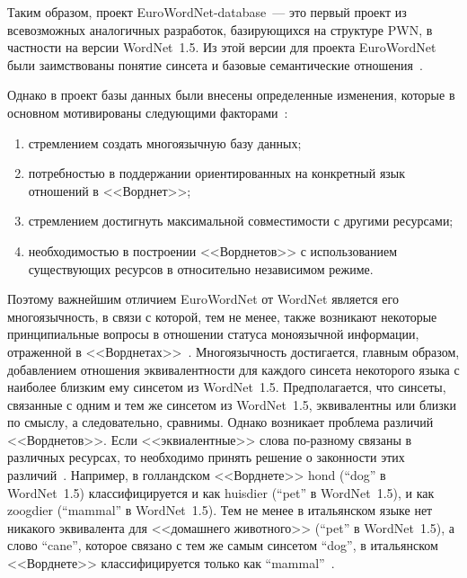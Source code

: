 \begin{multicols}{2}
     Таким образом, проект EuroWordNet-database~--- это первый проект из 
всевозможных аналогичных разработок, базирующихся на структуре PWN, 
в частности на версии WordNet~1.5. Из этой версии для проекта 
EuroWordNet были заимствованы понятие синсета и базовые семантические 
отношения~\cite{4koz}.
     
     Однако в проект базы данных были внесены определенные изменения, 
которые в основном мотивированы следующими факторами~\cite{4koz}:
     \begin{enumerate}[(1)]
     \item  стремлением создать многоязычную базу данных;
\item потребностью в поддержании ориентированных на конкретный 
язык отношений в <<Ворднет>>;
\item стремлением достигнуть максимальной со\-вмес\-ти\-мости с другими 
ресурсами;
\item необходимостью в построении <<Ворднетов>> с использованием 
существующих ресурсов в относительно независимом режиме.
     \end{enumerate}
     Поэтому важнейшим отличием EuroWordNet от WordNet  является его 
многоязычность, в связи с которой, тем не менее, также возникают некоторые 
принципиальные вопросы в отношении статуса моноязычной информации, 
отраженной в <<Ворднетах>>~\cite{7koz}. Многоязычность достигается, 
главным образом, добавлением отношения эквивалентности для каждого 
синсета некоторого языка с наиболее близким ему синсетом из WordNet~1.5. 
Предполагается, что синсеты, связанные с одним и тем же синсетом из 
WordNet~1.5, эквивалентны или близки по смыслу, а следовательно, сравнимы. 
Однако возникает проблема различий <<Ворднетов>>. Если 
<<эквиалентные>> слова по-разному связаны в различных ресурсах, то 
необходимо принять решение о законности этих различий~\cite{4koz}. 
Например, в голландском <<Ворднете>> hond (``dog'' в WordNet~1.5) 
классифицируется и как huisdier (``pet'' в WordNet~1.5), и как zoogdier 
(``mammal'' в WordNet~1.5). Тем не менее в итальянском языке нет никакого 
эквивалента для <<домашнего животного>> (``pet'' в WordNet~1.5), а слово 
``cane'', которое связано с тем же самым синсетом ``dog'', в итальянском 
<<Ворднете>> классифицируется только как ``mammal''~\cite{4koz}.
     

\end{multicols}
